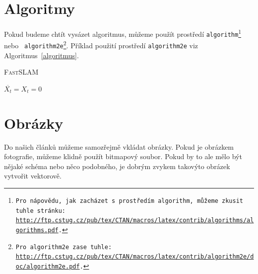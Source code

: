 \documentclass[a4paper, 11pt]{article}
\begin{document}
    \bigskip
	\pagebreak
	
 \section{Algoritmy} \label{sekcia3:algoritmy}
 
    Pokud budeme chtít vysázet algoritmus, můžeme použít prostředí \texttt{algorithm\footnote{Pro nápovědu, jak zacházet s~prostředím \texttt{algorithm}, můžeme zkusit tuhle stránku:\\
	\href{http://ftp.cstug.cz/pub/tex/CTAN/macros/latex/contrib/algorithms/algorithms.pdf}{http://ftp.cstug.cz/pub/tex/CTAN/macros/latex/contrib/algorithms/algorithms.pdf}.
	}} nebo \texttt{ algorithm2e\footnote{Pro \texttt{algorithm2e} zase tuhle: \href{http://ftp.cstug.cz/pub/tex/CTAN/macros/latex/contrib/algorithm2e/doc/algorithm2e.pdf}{http://ftp.cstug.cz/pub/tex/CTAN/macros/latex/contrib/algorithm2e/doc/algorithm2e.pdf}.
	}}. Příklad použití prostředí \texttt{algorithm2e} viz Algoritmus~\ref{algoritmus}.
	\bigskip
	\begin{algorithm} \label{algoritmus}
    \SetNlSty{}{}{:}
    \caption{\textsc{FastSLAM}}
    $\overline{X_t} = X_t = 0$ \\
    \end{algorithm}
    
  \section{Obrázky}
  
    Do našich článků můžeme samozřejmě vkládat obrázky. Pokud je obrázkem fotografie,
	můžeme klidně použít bitmapový soubor. Pokud by to ale mělo být nějaké schéma nebo
	něco podobného, je dobrým zvykem takovýto obrázek vytvořit vektorově.
	
\end{document}
